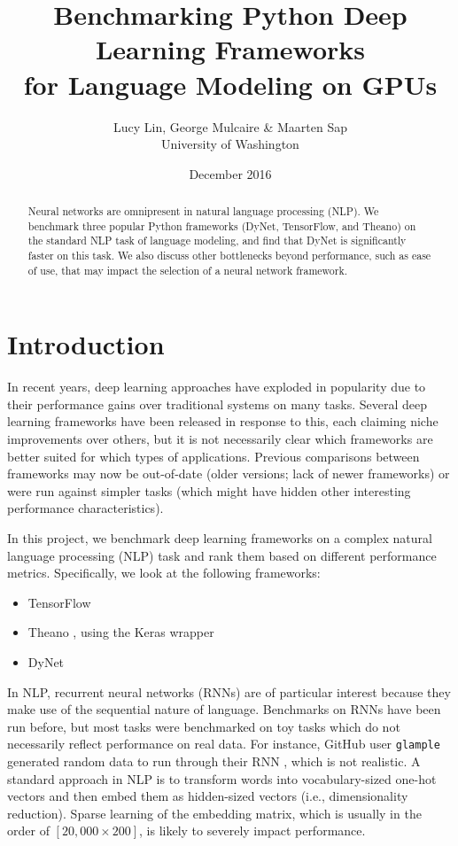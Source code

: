 \documentclass{article}
\title{Benchmarking Python Deep Learning Frameworks\\ for Language Modeling on GPUs}
\author{Lucy Lin, George Mulcaire \& Maarten Sap
\\University of Washington}
\date{December 2016}
\begin{document}
\maketitle

\begin{abstract}
Neural networks are omnipresent in natural language processing (NLP).
We benchmark three popular Python frameworks (DyNet, TensorFlow, and Theano) on the standard NLP task of language modeling, and find that DyNet is significantly faster on this task. We also discuss other bottlenecks beyond performance, such as ease of use, that may impact the selection of a neural network framework.
\end{abstract}


\section{Introduction}
In recent years, deep learning approaches have exploded in popularity due to their performance gains over traditional systems on many tasks. Several deep learning frameworks have been released in response to this, each claiming niche improvements over others, but it is not necessarily clear which frameworks are better suited for which types of applications. Previous comparisons between frameworks may now be out-of-date (older versions; lack of newer frameworks) or were run against simpler tasks (which might have hidden other interesting performance characteristics).

In this project, we benchmark deep learning frameworks on a complex natural language processing (NLP) task and rank them based on different performance metrics. Specifically, we look at the following frameworks:
\begin{itemize}
	\item TensorFlow \cite{tensorflow}
	\item Theano \cite{theano}, using the Keras wrapper \cite{keras}
	\item DyNet \cite{dynet}
\end{itemize}
In NLP, recurrent neural networks (RNNs) are of particular interest because they make use of the sequential nature of language. Benchmarks on RNNs have been run before, but most tasks were benchmarked on toy tasks which do not necessarily reflect performance on real data. For instance, GitHub user \verb!glample! generated random data to run through their RNN \cite{glample}, which is not realistic. A standard approach in NLP is to transform words into vocabulary-sized one-hot vectors and then embed them as hidden-sized vectors (i.e., dimensionality reduction). Sparse learning of the embedding matrix, which is usually in the order of $[20,000 \times 200]$, is likely to severely impact performance.
\end{document}

